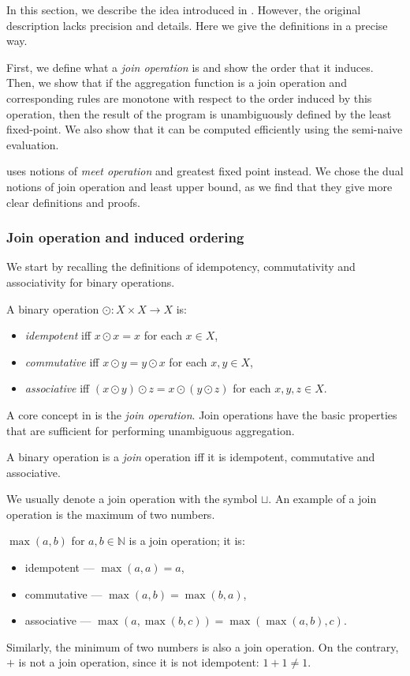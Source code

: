 In this section, we describe the idea introduced in \cite{socialite}. However, the original description lacks precision and details. Here we give the definitions in a precise way.

First, we define what a \emph{join operation} is and show the order that it induces. Then, we show that if the aggregation function is a join operation and corresponding rules are monotone with respect to the order induced by this operation, then the result of the program is unambiguously defined by the least fixed-point. We also show that it can be computed efficiently using the semi-naive evaluation.

\cite{socialite} uses notions of \emph{meet operation} and greatest fixed point instead. We chose the dual notions of join operation and least upper bound, as we find that they give more clear definitions and proofs.

\subsubsection{Join operation and induced ordering}
We start by recalling the definitions of idempotency, commutativity and associativity for binary operations.
\begin{defn}
A binary operation $\odot: X \times X \to X$ is:
\begin{itemize}
\item \emph{idempotent} iff $x \odot x = x$ for each $x \in X$,
\item \emph{commutative} iff $x \odot y = y \odot x$ for each $x, y \in X$,
\item \emph{associative} iff $(x \odot y) \odot z = x \odot (y \odot z)$ for each $x, y, z \in X$.
\end{itemize}
\end{defn}

A core concept in \datalogra is the \emph{join operation}. Join operations have the basic properties that are sufficient for performing unambiguous aggregation.

\begin{defn}
A binary operation is a \emph{join} operation iff it is idempotent, commutative and associative. 
\end{defn}

We usually denote a join operation with the symbol $\sqcup$.
An example of a join operation is the maximum of two numbers.

\begin{exmp}
$\max(a, b)$ for $a, b \in \mathbb{N}$ is a join operation; it is:
\begin{itemize}
\item idempotent --- $\max(a, a) = a$,
\item commutative --- $\max(a, b) = \max(b, a)$,
\item associative --- $\max(a, \max(b, c)) = \max(\max(a, b), c)$.
\end{itemize}

Similarly, the minimum of two numbers is also a join operation. On the contrary, $+$ is not a join operation, since it is not idempotent: $1+1 \ne 1$.
\end{exmp}

